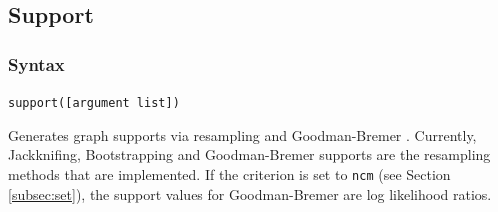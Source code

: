 \subsection{Support}
\label{subsec:support}
	\subsubsection{Syntax}
		\texttt{support([argument list])}
		
	\begin{phygdescription}
		{Generates graph supports via resampling \citep{Farrisetal1996} and Goodman-Bremer  
		\citep{Goodmanetal1982, bremer1994}. Currently, Jackknifing, Bootstrapping and 
		Goodman-Bremer supports are the resampling methods that are implemented. If
		the criterion is set to \texttt{ncm} (see Section \ref{subsec:set}), the support values 
		for Goodman-Bremer are log likelihood ratios.}
	\end{phygdescription}
		
